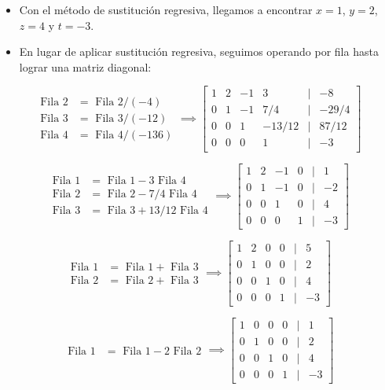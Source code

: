 \documentclass[openany]{book}
\providecommand{\tightlist}{%
  \setlength{\itemsep}{0pt}\setlength{\parskip}{0pt}}
\begin{document}
\begin{itemize}
\tightlist
\item
  Con el método de sustitución regresiva, llegamos a encontrar \(x=1\), \(y=2\), \(z=4\) y \(t=-3\).
\item
  En lugar de aplicar sustitución regresiva, seguimos operando por fila hasta lograr una matriz diagonal:
\end{itemize}

\[
\begin{array}{cl}
\text{Fila 2} &= \text{ Fila 2} / (-4) \\ 
\text{Fila 3} &= \text{ Fila 3} /(-12) \\
\text{Fila 4} &= \text{ Fila 4} / (-136) 
\end{array}
\implies
\begin{bmatrix}
1 & 2 & -1 & 3 &|& -8\\
0 & 1 & -1 & 7/4 &|& -29/4\\
0 & 0 & 1 & -13/12 &|& 87/12\\
0 & 0 & 0 & 1 &|& -3  
\end{bmatrix}
\]

\[
\begin{array}{cl}
\text{Fila 1} &= \text{ Fila 1} - 3 \text{ Fila 4} \\ 
\text{Fila 2} &= \text{ Fila 2} - 7/4 \text{ Fila 4}\\
\text{Fila 3} &= \text{ Fila 3} + 13/12 \text{ Fila 4} 
\end{array}
\implies
\begin{bmatrix}
1 & 2 & -1 & 0 &|& 1\\
0 & 1 & -1 & 0 &|& -2\\
0 & 0 & 1 & 0 &|& 4\\
0 & 0 & 0 & 1 &|& -3  
\end{bmatrix}
\]

\[
\begin{array}{cl}
\text{Fila 1} &= \text{ Fila 1} + \text{ Fila 3} \\ 
\text{Fila 2} &= \text{ Fila 2} + \text{ Fila 3}
\end{array}
\implies
\begin{bmatrix}
1 & 2 & 0 & 0 &|& 5\\
0 & 1 & 0 & 0 &|& 2\\
0 & 0 & 1 & 0 &|& 4\\
0 & 0 & 0 & 1 &|& -3  
\end{bmatrix}
\]

\[
\begin{array}{cl}
\text{Fila 1} &= \text{ Fila 1} -2 \text{ Fila 2} 
\end{array}
\implies
\begin{bmatrix}
1 & 0 & 0 & 0 &|& 1\\
0 & 1 & 0 & 0 &|& 2\\
0 & 0 & 1 & 0 &|& 4\\
0 & 0 & 0 & 1 &|& -3  
\end{bmatrix}
\]
\end{document}
